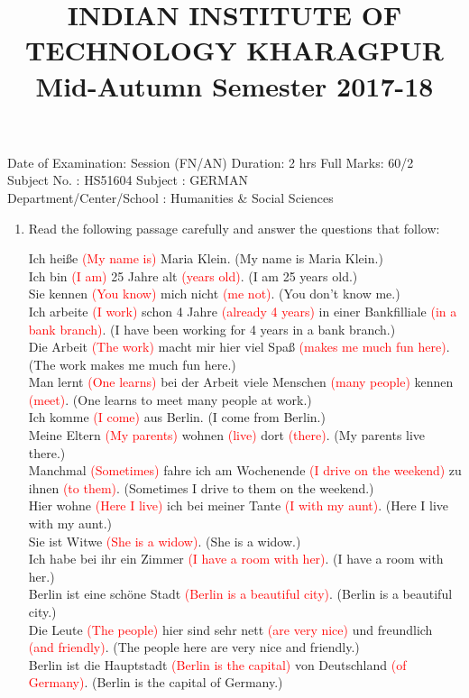 \documentclass{article}
\title{
INDIAN INSTITUTE OF TECHNOLOGY KHARAGPUR \\ Mid-Autumn Semester 2017-18
}
\author{}
\date{}
\begin{document}
\maketitle

\noindent
Date of Examination: Session (FN/AN) Duration: 2 hrs \qquad Full Marks: 60/2 \\
Subject No. : HS51604 \qquad Subject : GERMAN \\
Department/Center/School : Humanities \& Social Sciences

\begin{enumerate}
    \item Read the following passage carefully and answer the questions that follow:

    Ich heiße \textcolor{red}{(My name is)} Maria Klein. (My name is Maria Klein.) \\
    Ich bin \textcolor{red}{(I am)} 25 Jahre alt \textcolor{red}{(years old)}. (I am 25 years old.) \\
    Sie kennen \textcolor{red}{(You know)} mich nicht \textcolor{red}{(me not)}. (You don't know me.) \\
    Ich arbeite \textcolor{red}{(I work)} schon 4 Jahre \textcolor{red}{(already 4 years)} in einer Bankfilliale \textcolor{red}{(in a bank branch)}. (I have been working for 4 years in a bank branch.) \\
    Die Arbeit \textcolor{red}{(The work)} macht mir hier viel Spaß \textcolor{red}{(makes me much fun here)}. (The work makes me much fun here.) \\
    Man lernt \textcolor{red}{(One learns)} bei der Arbeit viele Menschen \textcolor{red}{(many people)} kennen \textcolor{red}{(meet)}. (One learns to meet many people at work.) \\
    Ich komme \textcolor{red}{(I come)} aus Berlin. (I come from Berlin.) \\
    Meine Eltern \textcolor{red}{(My parents)} wohnen \textcolor{red}{(live)} dort \textcolor{red}{(there)}. (My parents live there.) \\
    Manchmal \textcolor{red}{(Sometimes)} fahre ich am Wochenende \textcolor{red}{(I drive on the weekend)} zu ihnen \textcolor{red}{(to them)}. (Sometimes I drive to them on the weekend.) \\
    Hier wohne \textcolor{red}{(Here I live)} ich bei meiner Tante \textcolor{red}{(I with my aunt)}. (Here I live with my aunt.) \\
    Sie ist Witwe \textcolor{red}{(She is a widow)}. (She is a widow.) \\
    Ich habe bei ihr ein Zimmer \textcolor{red}{(I have a room with her)}. (I have a room with her.) \\
    Berlin ist eine schöne Stadt \textcolor{red}{(Berlin is a beautiful city)}. (Berlin is a beautiful city.) \\
    Die Leute \textcolor{red}{(The people)} hier sind sehr nett \textcolor{red}{(are very nice)} und freundlich \textcolor{red}{(and friendly)}. (The people here are very nice and friendly.) \\
    Berlin ist die Hauptstadt \textcolor{red}{(Berlin is the capital)} von Deutschland \textcolor{red}{(of Germany)}. (Berlin is the capital of Germany.)


\end{enumerate}
\end{document}
